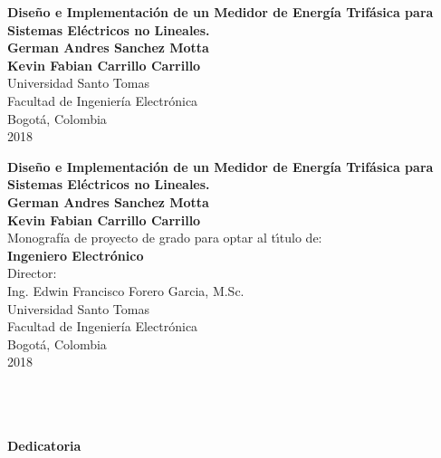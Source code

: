 \begin{center}
\thispagestyle{empty} \vspace*{0cm} \huge\textbf{
Diseño e Implementaci\'{o}n de un Medidor de Energ\'{i}a Trif\'{a}sica para Sistemas El\'{e}ctricos no Lineales. }\\[6.0cm]
\Large\textbf{German Andres Sanchez Motta\\Kevin Fabian Carrillo Carrillo}\\[6.0cm]
\small Universidad Santo Tomas\\
Facultad de Ingenier\'{i}a Electr\'{o}nica\\
Bogot\'{a}, Colombia\\
2018\\
\end{center}

\newpage{\pagestyle{empty}\clearpage}

\newpage
\begin{center}
\thispagestyle{empty} \vspace*{0cm} \huge\textbf{
Diseño e Implementaci\'{o}n de un Medidor de Energ\'{i}a Trif\'{a}sica para Sistemas El\'{e}ctricos no Lineales. }\\[2.5cm]
\Large\textbf{German Andres Sanchez Motta\\Kevin Fabian Carrillo Carrillo}\\[2.5cm]
\small Monograf\'{i}a de proyecto de grado para optar al
t\'{\i}tulo de:\\
\textbf{Ingeniero Electr\'{o}nico }\\[2.5cm]

Director:\\
Ing. Edwin Francisco Forero Garcia, M.Sc.\\[3.7cm]




Universidad Santo Tomas\\
Facultad de Ingenier\'{i}a Electr\'{o}nica \\
Bogot\'{a}, Colombia\\
2018\\
\end{center}


\newpage{\clearpage}
\thispagestyle{empty} \textbf{}\normalsize
\\\\\\%
\textbf{\LARGE Dedicatoria}\\[4.0cm]
\setcounter{page}{3}
\\\\

